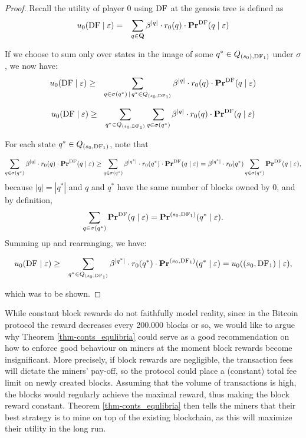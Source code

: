 \begin{proof}
Recall the utility of player $0$ using $\text{\rm DF}$ at the genesis tree is defined as 
\begin{eqnarray*}
u_0(\text{\rm DF} \mid \varepsilon) & = & \sum_{q \in \mathbf{Q}} \beta^{|q|} \cdot  r_0(q) \cdot \mathbf{Pr}^{\text{\rm DF}}(q \mid \varepsilon)
\end{eqnarray*}

If we choose to sum only over states in the image of some $q^* \in Q_{(s_0),\text{\rm DF}_1)}$ under $\sigma$, we now have: 
\begin{eqnarray*}
u_0(\text{\rm DF} \mid \varepsilon) & \geq & \sum_{q \in \sigma(q^*) \,\mid\, q^* \in Q_{(s_0,\text{\rm DF}_1)}} \beta^{|q|} \cdot  r_0(q) \cdot \mathbf{Pr}^{\text{\rm DF}}(q \mid \varepsilon)
\end{eqnarray*}

\begin{eqnarray*}
u_0(\text{\rm DF} \mid \varepsilon) & \geq &\sum_{q^* \in Q_{(s_0,\text{\rm DF}_1)}}   \sum_{q \in \sigma(q^*)} \beta^{|q|} \cdot  r_0(q) \cdot \mathbf{Pr}^{\text{\rm DF}}(q \mid \varepsilon)
\end{eqnarray*}

For each state $q^* \in Q_{(s_0,\text{\rm DF}_1)}$, note that 

$$\sum_{q \in \sigma(q^*)} \beta^{|q|} \cdot  r_0(q) \cdot \mathbf{Pr}^{\text{\rm DF}}(q \mid \varepsilon) \geq \sum_{q \in \sigma(q^*)} \beta^{|q^*|} \cdot  r_0(q^*) \cdot \mathbf{Pr}^{\text{\rm DF}}(q \mid \varepsilon) = \beta^{|q^*|} \cdot  r_0(q^*) \sum_{q \in \sigma(q^*)}  \mathbf{Pr}^{\text{\rm DF}}(q \mid \varepsilon), $$ because $|q| = |q^*|$ and 
$q$ and $q^*$ have the same number of blocks owned by $0$, and by definition,
$$\sum_{q \in \sigma(q^*)}  \mathbf{Pr}^{\text{\rm DF}}(q \mid \varepsilon) = \mathbf{Pr}^{(s_0,\text{\rm DF}_1)}(q^* \mid \varepsilon).$$ 
Summing up and rearranging, we have: 

\begin{eqnarray*}
u_0(\text{\rm DF} \mid \varepsilon) & \geq &\sum_{q^* \in Q_{(s_0,\text{\rm DF}_1)}}  \beta^{|q^*|} \cdot  r_0(q^*) \cdot \mathbf{Pr}^{(s_0,\text{\rm DF}_1)}(q^* \mid \varepsilon) = u_0((s_0,\text{\rm DF}_1) \mid \varepsilon), 
\end{eqnarray*}

which was to be shown.
\end{proof}


While constant block rewards do not faithfully model reality, since in the Bitcoin protocol the reward decreases every 200.000 blocks or so, we would like to argue why Theorem \ref{thm-conts_equlibria} could serve as a good recommendation on how to enforce good behaviour on miners at the moment block rewards become insignificant. More precisely, if block rewards are negligible, the transaction fees will dictate the miners' pay-off, so the protocol could place a (constant) total fee limit on newly created blocks. Assuming that the volume of transactions is high, the blocks would regularly achieve the maximal reward, thus making the block reward constant. Theorem \ref{thm-conts_equlibria} then tells the miners that their best strategy is to mine on top of the existing blockchain, as this will maximize their utility in the long run.


